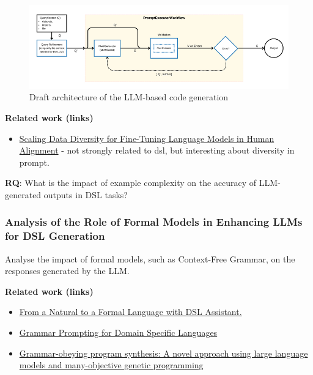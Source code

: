 \begin{figure}
    \centering
    \includegraphics[width=0.95\linewidth]{fig/authoring-assistant-architecture.png}
    \caption{Draft architecture of the LLM-based code generation}
    \label{fig:authoring-assistant-architecture}
\end{figure}

\textbf{Related work (links)}
\begin{itemize}
    \item \href{http://www.lrec-conf.org/proceedings/lrec-coling-2024/pdf/2024.main-1.1251.pdf}{Scaling Data Diversity for Fine-Tuning Language Models in Human Alignment} - not strongly related to dsl, but interesting about diversity in prompt.
\end{itemize}

\textbf{RQ}: What is the impact of example complexity on the accuracy of LLM-generated outputs in DSL tasks?

\subsubsection{Analysis of the Role of Formal Models in Enhancing LLMs for DSL Generation}

Analyse the impact of formal models, such as Context-Free Grammar, on the responses generated by the LLM.

\textbf{Related work (links)}
\begin{itemize}
    \item \href{https://dl.acm.org/doi/10.1145/3652620.3687811}{From a Natural to a Formal Language with DSL Assistant.}
    \item \href{https://proceedings.neurips.cc/paper_files/paper/2023/file/cd40d0d65bfebb894ccc9ea822b47fa8-Paper-Conference.pdf}{Grammar Prompting for Domain Specific Languages}
    \item \href{https://www.sciencedirect.com/science/article/abs/pii/S0920548924001077}{Grammar-obeying program synthesis: A novel approach using large language models and many-objective genetic programming}
\end{itemize}

